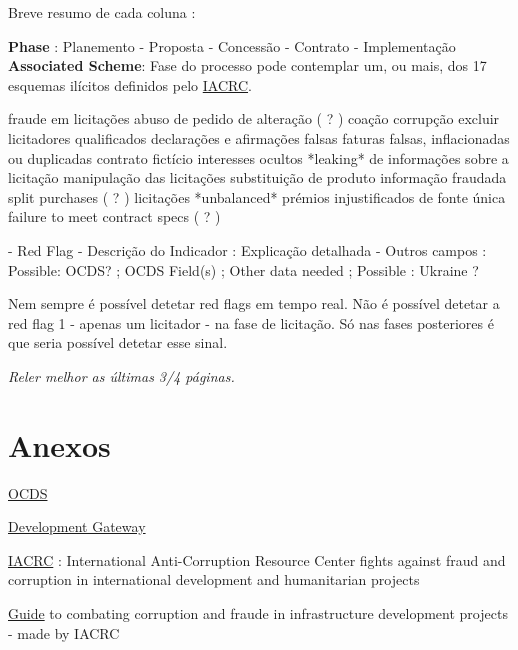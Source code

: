 \documentclass{book}
\begin{document}
Breve resumo de cada coluna : 

\begin{outline}[enumerate]
	
	\1 \textbf{Phase} : Planemento - Proposta - Concessão - Contrato - Implementação
	\1 \textbf{Associated Scheme}: Fase do processo pode contemplar um, ou mais, dos 17 esquemas ilícitos definidos pelo \href{https://guide.iacrc.org/the-red-flags-of-corruption-bid-rigging-collusive-bidding-and-fraud/}{IACRC}. 
		
		\2 fraude em licitações 
		\2 abuso de pedido de alteração ( ? )
		\2 coação
		\2 corrupção
		\2 excluir licitadores qualificados
		\2 declarações e afirmações falsas
		\2 faturas falsas, inflacionadas ou duplicadas
		\2 contrato fictício
		\2 interesses ocultos
		\2  *leaking* de informações sobre a licitação
		\2  manipulação das licitações
		\2  substituição de produto
		\2  informação fraudada
		\2  split purchases ( ? )
		\2  licitações *unbalanced*
		\2  prémios injustificados de fonte única
		\2  failure to meet contract specs ( ? ) 
	
	\1 - Red Flag
	\1 - Descrição do Indicador : Explicação detalhada
	\1 - Outros campos : Possible: OCDS? ; OCDS Field(s) ; Other data needed ; Possible : Ukraine ? 
	
\end{outline}



Nem sempre é possível detetar red flags em tempo real. Não é possível detetar a red flag 1 - apenas um licitador - na fase de licitação. Só nas fases posteriores é que seria possível detetar esse sinal.  

\textit{Reler melhor as últimas 3/4 páginas.}


\section*{Anexos}

\href{https://www.open-contracting.org/}{OCDS} 

\href{https://developmentgateway.org/}{Development Gateway}

\href{https://iacrc.org/training-courses/}{IACRC} : International Anti-Corruption Resource Center fights against fraud and corruption in international development and humanitarian projects

\href{https://guide.iacrc.org/}{Guide} to combating corruption and fraude in infrastructure development projects - made by IACRC
\end{document}
